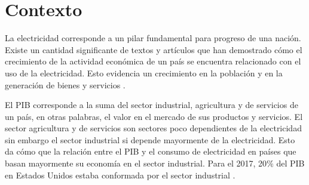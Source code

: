 \documentclass{article}
\begin{document}
\section{Contexto}




La electricidad corresponde a un pilar fundamental para progreso de una nación.   Existe un cantidad significante de textos y artículos que han demostrado cómo el crecimiento  de la actividad económica de un país se encuentra relacionado con el uso de la electricidad. Esto evidencia un crecimiento en la población y en la generación de bienes y servicios \cite{chen_relationship_2007}. 

El PIB  corresponde a la suma del sector  industrial, agricultura y de servicios de un país, en otras palabras, el valor en el mercado de sus productos y servicios. El sector agricultura y de servicios son sectores poco dependientes de la electricidad sin embargo el sector industrial si depende mayormente de la electricidad. Esto da cómo que la relación entre el PIB y el consumo de electricidad en países que basan mayormente su economía en el sector industrial. Para el 2017, 20$\%$ del PIB en Estados Unidos estaba conformada por el sector industrial \cite{noauthor_why_2014}. 
\end{document}
